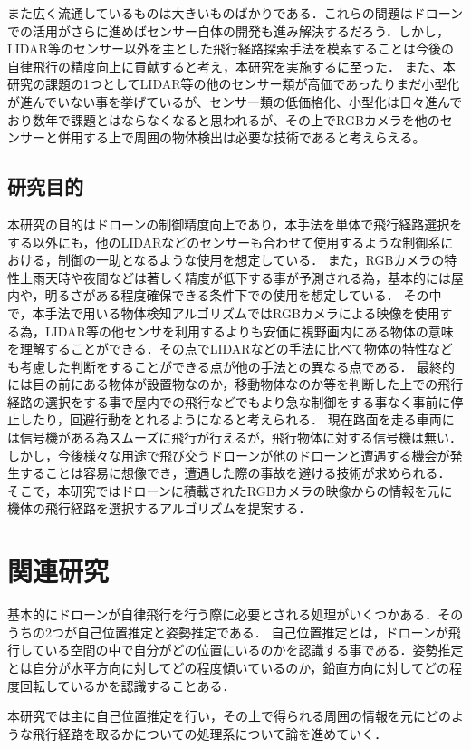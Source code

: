 \documentclass[uplatex,a4j,10pt]{jsarticle}
\begin{document}
また広く流通しているものは大きいものばかりである．これらの問題はドローンでの活用がさらに進めばセンサー自体の開発も進み解決するだろう．しかし，LIDAR等のセンサー以外を主とした飛行経路探索手法を模索することは今後の自律飛行の精度向上に貢献すると考え，本研究を実施するに至った．
また、本研究の課題の1つとしてLIDAR等の他のセンサー類が高価であったりまだ小型化が進んでいない事を挙げているが、センサー類の低価格化、小型化は日々進んでおり数年で課題とはならなくなると思われるが、その上でRGBカメラを他のセンサーと併用する上で周囲の物体検出は必要な技術であると考えらえる。


\subsection{研究目的}
本研究の目的はドローンの制御精度向上であり，本手法を単体で飛行経路選択をする以外にも，他のLIDARなどのセンサーも合わせて使用するような制御系における，制御の一助となるような使用を想定している．
また，RGBカメラの特性上雨天時や夜間などは著しく精度が低下する事が予測される為，基本的には屋内や，明るさがある程度確保できる条件下での使用を想定している．
その中で，本手法で用いる物体検知アルゴリズムではRGBカメラによる映像を使用する為，LIDAR等の他センサを利用するよりも安価に視野画内にある物体の意味を理解することができる．その点でLIDARなどの手法に比べて物体の特性なども考慮した判断をすることができる点が他の手法との異なる点である．
最終的には目の前にある物体が設置物なのか，移動物体なのか等を判断した上での飛行経路の選択をする事で屋内での飛行などでもより急な制御をする事なく事前に停止したり，回避行動をとれるようになると考えられる．
現在路面を走る車両には信号機がある為スムーズに飛行が行えるが，飛行物体に対する信号機は無い．しかし，今後様々な用途で飛び交うドローンが他のドローンと遭遇する機会が発生することは容易に想像でき，遭遇した際の事故を避ける技術が求められる．
そこで，本研究ではドローンに積載されたRGBカメラの映像からの情報を元に機体の飛行経路を選択するアルゴリズムを提案する．

\section{関連研究}
基本的にドローンが自律飛行を行う際に必要とされる処理がいくつかある．そのうちの2つが自己位置推定と姿勢推定である．
自己位置推定とは，ドローンが飛行している空間の中で自分がどの位置にいるのかを認識する事である．姿勢推定とは自分が水平方向に対してどの程度傾いているのか，鉛直方向に対してどの程度回転しているかを認識することある．

本研究では主に自己位置推定を行い，その上で得られる周囲の情報を元にどのような飛行経路を取るかについての処理系について論を進めていく．
\end{document}

